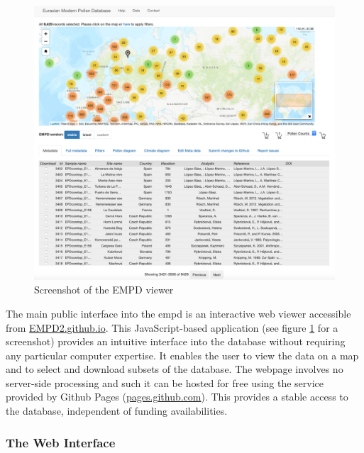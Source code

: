 \begin{refsection}
\begin{figure}[h]
	\includegraphics[width=\linewidth]{empd-figures/screenshot-compr.png}
	\caption{Screenshot of the EMPD viewer}
	\label{fig:empd-viewer}
\end{figure}

The main public interface into the \gls{empd} is an interactive web viewer accessible
from \href{https://EMPD2.github.io}{EMPD2.github.io}. This JavaScript-based application (see figure \ref{fig:empd-viewer} for a screenshot) provides an intuitive interface into the database without requiring any particular computer expertise. It enables the user to view the data on a map and to select and download subsets of the database. The webpage involves no server-side processing and such it can be hosted for free using the service provided by Github Pages (\href{https://pages.github.com/}{pages.github.com}). This provides a stable access to the database, independent of funding availabilities.

\subsubsection{The Web Interface}


\end{refsection}
